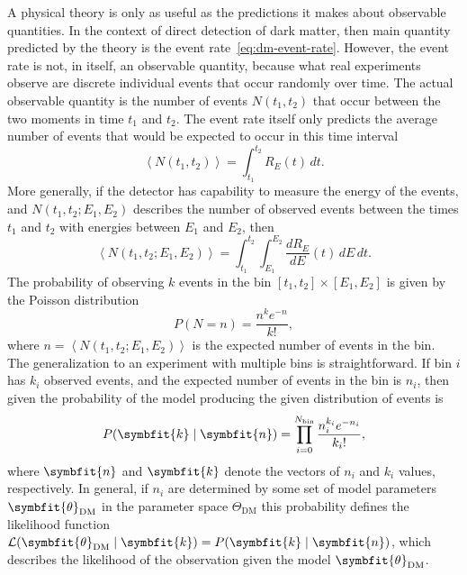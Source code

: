 \documentclass[b5paper, 10pt, twoside]{book}
\renewcommand{\vec}[1]{\symbfit{#1}}
\newcommand{\der}[2]{\frac{d#1}{d#2}}
\newcommand{\difd}{\,d}
\newcommand{\mean}[1]{\left\langle#1\right\rangle}
\begin{document}
A physical theory is only as useful as the predictions it makes about observable quantities. In the context of direct detection of dark matter, then main quantity predicted by the theory is the event rate~\eqref{eq:dm-event-rate}. However, the event rate is not, in itself, an observable quantity, because what real experiments observe are discrete individual events that occur randomly over time. The actual observable quantity is the number of events $N(t_1,t_2)$ that occur between the two moments in time $t_1$ and $t_2$. The event rate itself only predicts the average number of events that would be expected to occur in this time interval
\begin{equation}
    \mean{N(t_1,t_2)}=\int_{t_1}^{t_2}R_E(t)\difd t.
\end{equation}
More generally, if the detector has capability to measure the energy of the events, and $N(t_1,t_2;E_1,E_2)$ describes the number of observed events between the times $t_1$ and $t_2$ with energies between $E_1$ and $E_2$, then
\begin{equation}
    \mean{N(t_1,t_2;E_1,E_2)}=\int_{t_1}^{t_2}\int_{E_1}^{E_2}\der{R_E}{E}(t)\difd E\difd t.
\end{equation}
The probability of observing $k$ events in the bin $[t_1,t_2]\times[E_1,E_2]$ is given by the Poisson distribution
\begin{equation}
    P(N=n)=\frac{n^ke^{-n}}{k!},
\end{equation}
where $n=\mean{N(t_1,t_2;E_1,E_2)}$ is the expected number of events in the bin. The generalization to an experiment with multiple bins is straightforward. If bin $i$ has $k_i$ observed events, and the expected number of events in the bin is $n_i$, then given the probability of the model producing the given distribution of events is
\begin{equation}
    P(\vec{k}\mid \vec{n})=\prod_{i=0}^{N_\text{bin}}\frac{n_i^{k_i}e^{-n_i}}{{k_i}!},
\end{equation}
where $\vec{n}$ and $\vec{k}$ denote the vectors of $n_i$ and $k_i$ values, respectively. In general, if $n_i$ are determined by some set of model parameters $\vec{\theta}_\text{DM}$ in the parameter space $\Theta_\text{DM}$ this probability defines the likelihood function $\mathcal{L}(\vec{\theta}_\text{DM}\mid\vec{k})=P(\vec{k}\mid \vec{n})$, which describes the likelihood of the observation given the model $\vec{\theta}_\text{DM}$.
\end{document}
